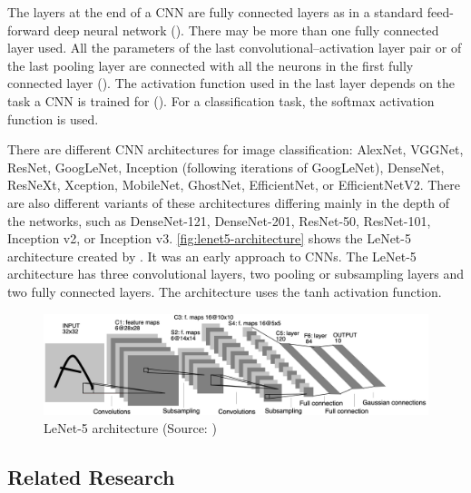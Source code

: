 \documentclass{BachelorBUI}
\begin{document}
                The layers at the end of a CNN are fully connected layers as in a standard feed-forward deep neural network (\cite{Aggarwal:2018}). There may be more than one fully connected layer used. All the parameters of the last convolutional--activation layer pair or of the last pooling layer are connected with all the neurons in the first fully connected layer (\cite{Aggarwal:2018}). The activation function used in the last layer depends on the task a CNN is trained for (\cite{Aggarwal:2018}). For a classification task, the softmax activation function is used.

                There are different CNN architectures for image classification: AlexNet, VGGNet, ResNet, GoogLeNet, Inception (following iterations of GoogLeNet), DenseNet, ResNeXt, Xception, MobileNet, GhostNet, EfficientNet, or EfficientNetV2. There are also different variants of these architectures differing mainly in the depth of the networks, such as DenseNet-121, DenseNet-201, ResNet-50, ResNet-101, Inception v2, or Inception v3. \autoref{fig:lenet5-architecture} shows the LeNet-5 architecture created by \textcite{LeCun:1998}. It was an early approach to CNNs. The LeNet-5 architecture has three convolutional layers, two pooling or subsampling layers and two fully connected layers. The architecture uses the tanh activation function.
                \begin{figure}[h]
                    \centering
                    \includegraphics[width=\textwidth]{lenet5_architecture.png}
                    \caption{LeNet-5 architecture (Source: \cite{LeCun:1998})}
                    \label{fig:lenet5-architecture}
                \end{figure}

    \subsection{Related Research}
\end{document}
